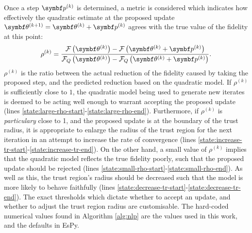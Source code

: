 Once a step $\bpk$ is determined, a metric is considered which indicates how
effectively the quadratic estimate at the proposed update $\bthkplusone = \bthk
+ \bpk$ agrees with the true value of the fidelity at this point:
\begin{equation}
    \rho^{(k)} = \frac
        {\Fthk - \Fthkpk}
        {\FQthk - \FQthkpk}.
\end{equation}
$\rho^{(k)}$ is the ratio between the actual reduction of the fidelity caused
by taking the proposed step, and the predicted reduction based on the quadratic
model. If $\rho^{(k)}$ is sufficiently close to $1$, the quadratic model being
used to generate new iterates is deemed to be acting well enough to warrant
accepting the proposed update
(lines \ref{state:large-rho-start}-\ref{state:large-rho-end}).
Furthermore, if $\rho^{(k)}$ is \emph{particulary} close to 1, and the proposed
update is at the boundary of the trust radius, it is appropriate to enlarge the
radius of the trust region for the next iteration in an attempt to increase the
rate of convergence
(lines \ref{state:increase-tr-start}-\ref{state:increase-tr-end}).
On the other hand, a small value of $\rho^{(k)}$ implies that the
quadratic model reflects the true fidelity poorly, such that the proposed
update should be rejected
(lines \ref{state:small-rho-start}-\ref{state:small-rho-end}).
As well as this, the trust region's radius should be
decreased such that the model is more likely to behave faithfully
(lines \ref{state:decrease-tr-start}-\ref{state:decrease-tr-end}). The exact
thresholds which dictate whether to accept an update, and whether to adjust the
trust region radius are customisable. The hard-coded numerical values found in
Algorithm \ref{alg:nlp} are the values used in this work, and the defaults in
\ac{EsPy}.

